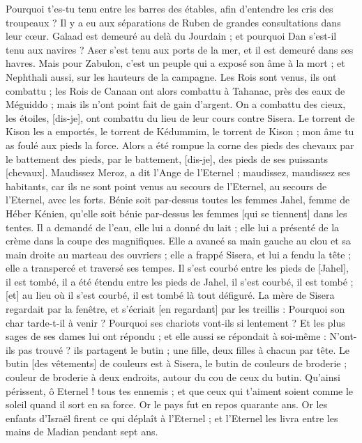 \begin{multicols}{2}
Pourquoi t'es-tu tenu entre les barres des étables, afin d'entendre les cris des troupeaux ? Il y a eu aux séparations de Ruben de grandes consultations dans leur cœur.
Galaad est demeuré au delà du Jourdain ; et pourquoi Dan s'est-il tenu aux navires ? Aser s'est tenu aux ports de la mer, et il est demeuré dans ses havres.
Mais pour Zabulon, c'est un peuple qui a exposé son âme à la mort ; et Nephthali aussi, sur les hauteurs de la campagne.
Les Rois sont venus, ils ont combattu ; les Rois de Canaan ont alors combattu à Tahanac, près des eaux de Méguiddo ; mais ils n'ont point fait de gain d'argent.
On a combattu des cieux, les étoiles, [dis-je], ont combattu du lieu de leur cours contre Sisera.
Le torrent de Kison les a emportés, le torrent de Kédummim, le torrent de Kison ; mon âme tu as foulé aux pieds la force.
Alors a été rompue la corne des pieds des chevaux par le battement des pieds, par le battement, [dis-je], des pieds de ses puissants [chevaux].
Maudissez Meroz, a dit l'Ange de l'Eternel ; maudissez, maudissez ses habitants, car ils ne sont point venus au secours de l'Eternel, au secours de l'Eternel, avec les forts.
Bénie soit par-dessus toutes les femmes Jahel, femme de Héber Kénien, qu'elle soit bénie par-dessus les femmes [qui se tiennent] dans les tentes.
Il a demandé de l'eau, elle lui a donné du lait ; elle lui a présenté de la crème dans la coupe des magnifiques.
Elle a avancé sa main gauche au clou et sa main droite au marteau des ouvriers ; elle a frappé Sisera, et lui a fendu la tête ; elle a transpercé et traversé ses tempes.
Il s'est courbé entre les pieds de [Jahel], il est tombé, il a été étendu entre les pieds de Jahel, il s'est courbé, il est tombé ; [et] au lieu où il s'est courbé, il est tombé là tout défiguré.
La mère de Sisera regardait par la fenêtre, et s'écriait [en regardant] par les treillis : Pourquoi son char tarde-t-il à venir ? Pourquoi ses chariots vont-ils si lentement ?
Et les plus sages de ses dames lui ont répondu ; et elle aussi se répondait à soi-même :
N'ont-ils pas trouvé ? ils partagent le butin ; une fille, deux filles à chacun par tête. Le butin [des vêtements] de couleurs est à Sisera, le butin de couleurs de broderie ; couleur de broderie à deux endroits, autour du cou de ceux du butin.
Qu'ainsi périssent, ô Eternel ! tous tes ennemis ; et que ceux qui t'aiment soient comme le soleil quand il sort en sa force. Or le pays fut en repos quarante ans.
\VerseOne{}Or les enfants d'Israël firent ce qui déplaît à l'Eternel ; et l'Eternel les livra entre les mains de Madian pendant sept ans.

\end{multicols}

